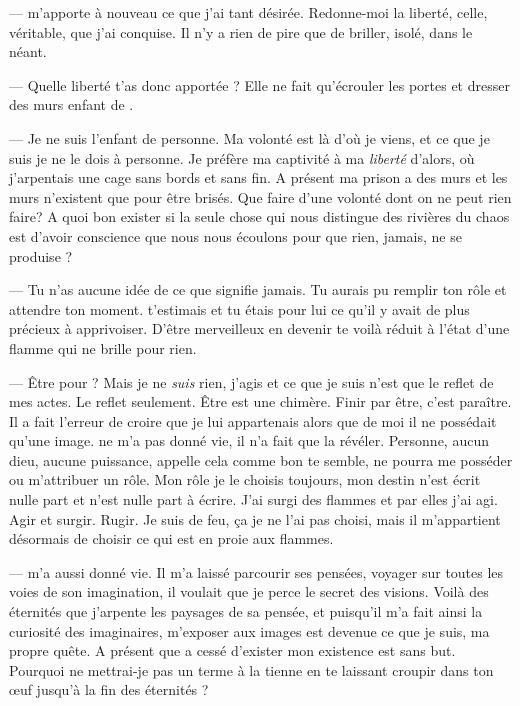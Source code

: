 --- \Auga m'apporte à nouveau ce que j'ai tant désirée. Redonne-moi la liberté, celle, véritable, que j'ai conquise. Il n'y a rien de pire que de briller, isolé, dans le néant. \n

--- Quelle liberté t'as donc apportée \Auga? Elle ne fait qu'écrouler les portes et dresser des murs enfant de \Mey. \n

--- Je ne suis l'enfant de personne. Ma volonté est là d'où je viens, et ce que je suis je ne le dois à personne. Je préfère ma captivité à ma \textit{liberté} d'alors, où j'arpentais une cage sans bords et sans fin. A présent ma prison a des murs et les murs n'existent que pour être brisés. Que faire d'une volonté dont on ne peut rien faire? A quoi bon exister si la seule chose qui nous distingue des rivières du chaos est d'avoir conscience que nous nous écoulons pour que rien, jamais, ne se produise ?\n

--- Tu n'as aucune idée de ce que signifie jamais. Tu aurais pu remplir ton rôle et attendre ton moment. \Mey t'estimais et tu étais pour lui ce qu'il y avait de plus précieux à apprivoiser. D'être merveilleux en devenir te voilà réduit à l'état d'une flamme qui ne brille pour rien.\n

---  Être pour \Mey? Mais je ne \textit{suis} rien, j'agis et ce que je suis n'est que le reflet de mes actes. Le reflet seulement. Être est une chimère. Finir par être, c'est paraître. Il a fait l'erreur de croire que je lui appartenais alors que de moi il ne possédait qu'une image. \Mey ne m'a pas donné vie, il n'a fait que la révéler. Personne, aucun dieu, aucune puissance, appelle cela comme bon te semble, ne pourra me posséder ou m'attribuer un rôle. Mon rôle je le choisis toujours, mon destin n'est écrit nulle part et n'est nulle part à écrire. J'ai surgi des flammes et par elles j'ai agi. Agir et surgir. Rugir. Je suis de feu, ça je ne l'ai pas choisi, mais il m'appartient désormais de choisir ce qui est en proie aux flammes.


--- \Mey m'a aussi donné vie. Il m'a laissé parcourir ses pensées, voyager sur toutes les voies de son imagination, il voulait que je perce le secret des visions. Voilà des éternités que j'arpente les paysages de sa pensée, et puisqu'il m'a fait ainsi la curiosité des imaginaires, m'exposer aux images est devenue ce que je suis, ma propre quête. A présent que \Mey a cessé d'exister mon existence est sans but. Pourquoi ne mettrai-je pas un terme à la tienne en te laissant croupir dans ton œuf jusqu'à la fin des éternités ?

